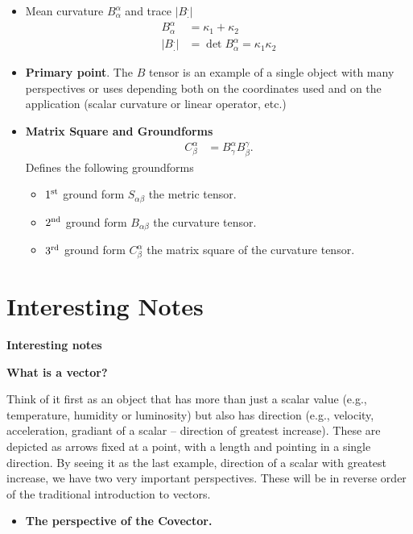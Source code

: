 \documentclass[12pt,a4paper]{report}
\begin{document}
\begin{description}
\begin{itemize}
	\item Mean curvature $B^\alpha_\alpha$ and trace $|B^._.|$
		\begin{align*}
			B^\alpha_\alpha &= \kappa_1 + \kappa_2 \\
			|B^._.| &= \det B^\alpha_\alpha = \kappa_1 \kappa_2
		\end{align*}

	\item \textbf{Primary point}.  The $B$ tensor is an example of a single object with many perspectives or uses depending both on the coordinates used and on the application (scalar curvature or linear operator, etc.)

	\item \textbf{Matrix Square and Groundforms}
		\begin{align*}
			C^\alpha_\beta &= B^\alpha_\gamma B^\gamma_\beta.
		\end{align*}Defines the following groundforms
		\begin{itemize}
			\item $1\textsuperscript{st}$ ground form $S_{\alpha\beta}$ the metric tensor.
			\item $2\textsuperscript{nd}$ ground form $B_{\alpha\beta}$ the curvature tensor.
			\item $3\textsuperscript{rd}$ ground form $C^\alpha_\beta$ the matrix square of the curvature tensor.
		\end{itemize}
\end{itemize}

\newpage
\section*{Interesting Notes}
\item \textbf{Interesting notes}
\begin{description}
	\item \textbf{What is a vector?}

		Think of it first as an object that has more than just a scalar value (e.g., temperature, humidity or luminosity) but also has direction (e.g., velocity, acceleration, gradiant of a scalar -- direction of greatest increase). These are depicted as arrows fixed at a point, with a length and pointing in a single direction.  By seeing it as the last example, direction of a scalar with greatest increase, we have two very important perspectives.  These will be in reverse order of the traditional introduction to vectors.
		\begin{itemize}
			\item \textbf{The perspective of the Covector.}


\end{itemize}
\end{description}
\end{description}
\end{document}
